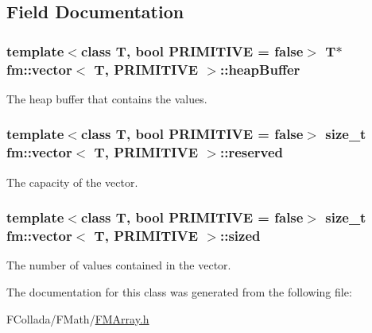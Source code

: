 \subsection{Field Documentation}
\hypertarget{classfm_1_1vector_a04d2e3a1f69f87fc9024f4f96a145cb6}{
\subsubsection[{heapBuffer}]{\setlength{\rightskip}{0pt plus 5cm}template$<$class T, bool PRIMITIVE = false$>$ T$\ast$ {\bf fm::vector}$<$ T, PRIMITIVE $>$::{\bf heapBuffer}}}
\label{classfm_1_1vector_a04d2e3a1f69f87fc9024f4f96a145cb6}
The heap buffer that contains the values. \hypertarget{classfm_1_1vector_ac0e612b5f0f159b22f93c9f9bb37b722}{
\subsubsection[{reserved}]{\setlength{\rightskip}{0pt plus 5cm}template$<$class T, bool PRIMITIVE = false$>$ size\_\-t {\bf fm::vector}$<$ T, PRIMITIVE $>$::{\bf reserved}}}
\label{classfm_1_1vector_ac0e612b5f0f159b22f93c9f9bb37b722}
The capacity of the vector. \hypertarget{classfm_1_1vector_af23c511dc075041959151b7bd02a214d}{
\subsubsection[{sized}]{\setlength{\rightskip}{0pt plus 5cm}template$<$class T, bool PRIMITIVE = false$>$ size\_\-t {\bf fm::vector}$<$ T, PRIMITIVE $>$::{\bf sized}}}
\label{classfm_1_1vector_af23c511dc075041959151b7bd02a214d}
The number of values contained in the vector. 

The documentation for this class was generated from the following file:\begin{DoxyCompactItemize}
\item 
FCollada/FMath/\hyperlink{FMArray_8h}{FMArray.h}\end{DoxyCompactItemize}
